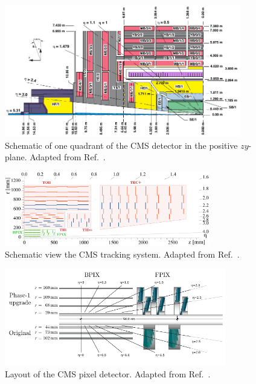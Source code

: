 
\begin{figure}[p]
  \vspace{-6mm}
  \centering
  \includegraphics[width=0.92\textwidth]{fig/detector/CMS_detector_longitudinal_edit.pdf}
  \caption{
Schematic of one quadrant of the CMS detector in the positive $zy$-plane.
Adapted from Ref.~\cite{CMS_eta}.
  } \label{fig:CMS_eta}
\end{figure}

\begin{figure}[p]
  \centering
  \includegraphics[width=0.8\textwidth]{fig/detector/CMS_tracker_Phase1_edit.pdf}
  \caption{
Schematic view the CMS tracking system.
Adapted from Ref.~\cite{CMS_tracker_sketch}.
  } \label{fig:CMS_tracker}
\end{figure}

\begin{figure}[p]
  \centering
  \includegraphics[width=0.86\textwidth]{fig/detector/CMS_pixel_Phase1_edit.pdf}
  \vspace{-2mm}
  \caption{
Layout of the CMS pixel detector.
Adapted from Ref.~\cite{CMS_pixel_Phase1_2021}.
  } \label{fig:CMS_pixel}
\end{figure}